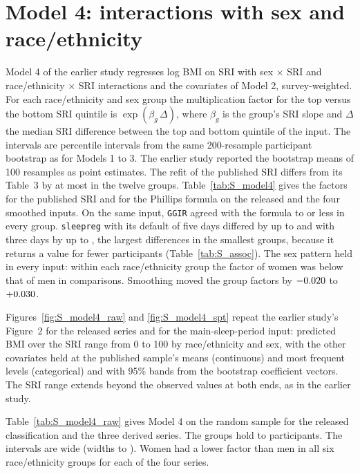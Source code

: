 \documentclass[12pt]{article}
\begin{document}
\section{Model 4: interactions with sex and race/ethnicity}
\label{sec:S_model4}
Model 4 of the earlier study regresses log BMI on SRI with sex $\times$ SRI and race/ethnicity $\times$ SRI interactions and the covariates of Model 2, survey-weighted. For each race/ethnicity and sex group the multiplication factor for the top versus the bottom SRI quintile is $\exp(\beta_g\,\Delta)$, where $\beta_g$ is the group's SRI slope and $\Delta$ the median SRI difference between the top and bottom quintile of the input. The intervals are percentile intervals from the same 200-resample participant bootstrap as for Models 1 to 3. The earlier study reported the bootstrap means of 100 resamples as point estimates. The refit of the published SRI differs from its Table~3 by at most \mfourPubMaxDiffOrig{} in the twelve groups. Table~\ref{tab:S_model4} gives the factors for the published SRI and for the Phillips formula on the released and the four smoothed inputs. On the same input, \texttt{GGIR} agreed with the formula to \mfourMaxDiffGgir{} or less in every group. \texttt{sleepreg} with its default of five days differed by up to \mfourMaxDiffSleepregFive{} and with three days by up to \mfourMaxDiffSleepregThree{}, the largest differences in the smallest groups, because it returns a value for fewer participants (Table~\ref{tab:S_assoc}). The sex pattern held in every input: within each race/ethnicity group the factor of women was below that of men in \mfourWomenBelowMen{} comparisons. Smoothing moved the group factors by $-0.020$ to $+0.030$.

Figures~\ref{fig:S_model4_raw} and \ref{fig:S_model4_spt} repeat the earlier study's Figure~2 for the released series and for the main-sleep-period input: predicted BMI over the SRI range from 0 to 100 by race/ethnicity and sex, with the other covariates held at the published sample's means (continuous) and most frequent levels (categorical) and with 95\% bands from the bootstrap coefficient vectors. The SRI range extends beyond the observed values at both ends, as in the earlier study.

Table~\ref{tab:S_model4_raw} gives Model 4 on the random sample for the released classification and the three derived series. The groups hold \mfourRawNmin{} to \mfourRawNmax{} participants. The intervals are wide (widths \mfourRawWidthMin{} to \mfourRawWidthMax{}). Women had a lower factor than men in all six race/ethnicity groups for each of the four series.
\end{document}

